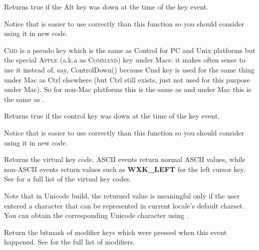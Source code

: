 Returns true if the Alt key was down at the time of the key event.

Notice that  is easier to use
correctly than this function so you should consider using it in new code.


\label{wxkeyeventcmddown}


\textsc{Cmd} is a pseudo key which is the same as Control for PC and Unix
platforms but the special \textsc{Apple} (a.k.a as \textsc{Command}) key under
Macs: it makes often sense to use it instead of, say, ControlDown() because Cmd
key is used for the same thing under Mac as Ctrl elsewhere (but Ctrl still
exists, just not used for this purpose under Mac). So for non-Mac platforms
this is the same as  and under
Mac this is the same as .


\label{wxkeyeventcontroldown}


Returns true if the control key was down at the time of the key event.

Notice that  is easier to use
correctly than this function so you should consider using it in new code.


\label{wxkeyeventgetkeycode}


Returns the virtual key code. ASCII events return normal ASCII values,
while non-ASCII events return values such as {\bf WXK\_LEFT} for the
left cursor key. See  for a full list of
the virtual key codes.

Note that in Unicode build, the returned value is meaningful only if the
user entered a character that can be represented in current locale's default
charset. You can obtain the corresponding Unicode character using
.


\label{wxkeyeventgetmodifiers}


Return the bitmask of modifier keys which were pressed when this event
happened. See  for the full list
of modifiers.

